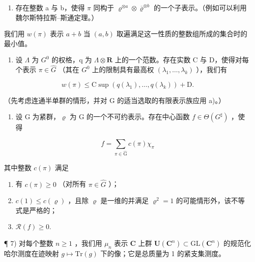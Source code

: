 \begin{enumerate}
\def\labelenumi{\alph{enumi})}
\tightlist
\item
  存在整数 a 与 b，使得 \(\pi\) 同构于 \(\varrho^{\otimes a} \otimes \overline{\varrho}^{\otimes b}\) 的一个子表示。（例如可以利用魏尔斯特拉斯–斯通定理。）
\end{enumerate}

我们用 \(w(\pi)\) 表示 \(a + b\) 当 \((a, b)\) 取遍满足这一性质的整数组所成的集合时的最小值。

\begin{enumerate}
\def\labelenumi{\alph{enumi})}
\setcounter{enumi}{1}
\tightlist
\item
  设 \(\Lambda\) 为 \(G^{0}\) 的权格，q 为 \(\Lambda\otimes \mathbf{R}\) 上的一个范数。存在实数 C 与 D，使得对每个表示 \(\pi\in\widehat{G}\) （其在 \(G^{0}\) 上的限制具有最高权 \((\lambda_{1},\ldots,\lambda_{k})\) ），我们有
\end{enumerate}

\[
w (\pi) \leqslant \mathrm{C} \sup (q (\lambda_ {1}), \dots , q (\lambda_ {k})) + \mathrm{D}.
\]

（先考虑连通半单群的情形，并对 G 的适当选取的有限表示族应用 a)。）

\begin{enumerate}
\def\labelenumi{\arabic{enumi})}
\setcounter{enumi}{5}
\tightlist
\item
  设 G 为紧群，\(\varrho\) 为 G 的一个不可约表示。存在中心函数 \(f \in \Theta(G^{\sharp})\) ，使得
\end{enumerate}

\[
f = \sum_ {\pi \in \widehat {\mathrm{G}}} c (\pi) \chi_ {\pi}
\]

其中整数 \(c(\pi)\) 满足

\begin{enumerate}
\def\labelenumi{(\roman{enumi})}
\item
  有 \(c(\pi) \geqslant 0\) （对所有 \(\pi \in \widehat{G}\) ）；
\item
  \(c(1) \leqslant c(\varrho)\) ，且除 \(\varrho\) 是一维的并满足 \(\varrho^{2} = 1\) 的可能情形外，该不等式是严格的；
\item
  \(\mathcal{R}(f) \geqslant 0.\)
\end{enumerate}

¶ 7) 对每个整数 \(n \geqslant 1\) ，我们用 \(\mu_n\) 表示 \(\mathbf{C}\) 上群 \(\mathbf{U}(\mathbf{C}^n) \subset \mathrm{GL}(\mathbf{C}^n)\) 的规范化哈尔测度在迹映射 \(g \mapsto \mathrm{Tr}(g)\) 下的像；它是总质量为 1 的紧支集测度。

